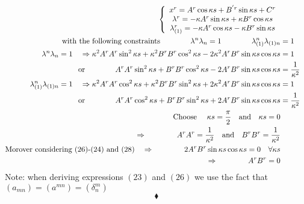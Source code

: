 \begin{align}
\left \{ \begin{array}{c}
x^r = A^{r}\cos \kappa s   + B^{'r}\sin \kappa s + C^r\\
\lambda^r =  -\kappa A^{r}\sin \kappa s  +\kappa B^{r}\cos \kappa s\\
\lambda_{(1)}^r = - \kappa A^{r}\cos \kappa s  - \kappa B^{r}\sin \kappa s\\
\end{array} \right.\\
\text{with the following constraints}\quad\quad\quad\quad \lambda^n\lambda_n = 1\quad\quad\quad\quad 
\lambda_{(1)}^n\lambda_{(1)n} &= 1\\
\lambda^n\lambda_n = 1\quad\Rightarrow \kappa^2 A^r A^r \sin ^2 \kappa s+ \kappa^2 B^r B^r \cos ^2 \kappa s - 2 \kappa^2 A^rB^r\sin\kappa s\cos \kappa s &= 1\\
\text{or} \quad\quad\quad\quad A^r A^r \sin ^2 \kappa s+  B^r B^r \cos ^2 \kappa s - 2 A^rB^r\sin\kappa s\cos \kappa s &= \frac{1}{\kappa^2 }\\
\lambda_{(1)}^n\lambda_{(1)n} = 1\quad\Rightarrow \kappa^2 A^r A^r \cos ^2 \kappa s+ \kappa^2 B^r B^r \sin ^2 \kappa s + 2 \kappa^2 A^rB^r\sin\kappa s\cos \kappa s &= 1\\
\text{or} \quad\quad\quad\quad A^r A^r \cos ^2 \kappa s+  B^r B^r \sin ^2 \kappa s + 2 A^rB^r\sin\kappa s\cos \kappa s &= \frac{1}{\kappa^2 }\\
\text{Choose }\quad \kappa s = \frac{\pi}{2}\quad\text{and} \quad \kappa s = 0\\
\Rightarrow \quad\quad\quad\quad A^r A^r =  \frac{1}{\kappa^2 }\quad\text{and}\quad B^r B^r =  \frac{1}{\kappa^2 }\\
\text{Morover considering (26)-(24) and (28)}\quad \Rightarrow \quad\quad\quad\quad 2A^rB^r\sin \kappa s \cos \kappa s =0 \quad \forall \kappa s\\
\Rightarrow \quad\quad\quad\quad A^rB^r=0
\end{align}
Note: when deriving expressions $(23)$ and $(26)$ we use the fact that $\left(a_{mn}\right) =  \left(a^{mn}\right) = \left(\delta^m_n\right) $
$$\blacklozenge$$
\newpage

